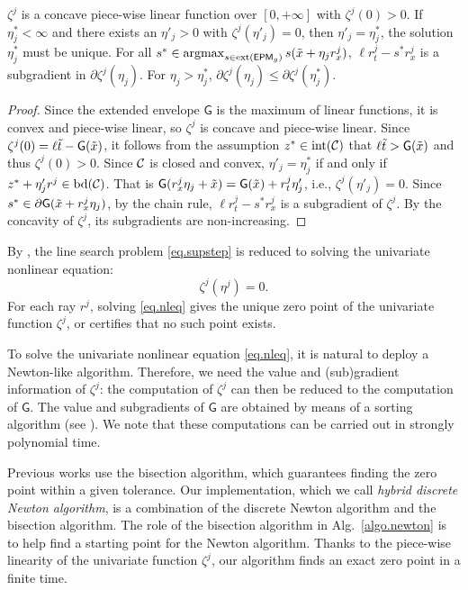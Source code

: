 \begin{proposition}
\label{prop.uni}
$\zeta^j$ is a  concave  piece-wise linear function over  $[0,+\infty]$ with  $\zeta^j(0) > 0$.  If $\eta^\ast_j < \infty$ and there exists an $\eta'_j > 0$ with $\zeta^j(\eta'_j) = 0$, then $\eta'_j = \eta^\ast_j$, \ie the solution $\eta^\ast_j$ must be unique.  For all $s^\ast \in \operatorname{argmax}_{s \in \operatorname{ext}(\mathsf{EPM}_{g})} s (\tilde{x}+\eta_j r^j_x)$, $\ell r^j_t- s^\ast r^j_x$ is a subgradient in $\partial \zeta^j( \eta_j)$. For $\eta_j > \eta^\ast_j$, $\partial \zeta^j( \eta_j) \le \partial \zeta^j( \eta^\ast_j)$.
\end{proposition}
\begin{proof}
Since  the extended envelope $\mathsf{G}$ is the maximum of linear functions, it is convex and piece-wise linear, so  $\zeta^j$ is concave and piece-wise linear. Since $\zeta^j(0) = \ell \tilde{t} - \mathsf{G}(\tilde{x})$, it follows from the assumption $z^\ast \in \operatorname{int}(\mathcal C)$ that $  \ell \tilde{t} >   \mathsf{G}(\tilde{x})$ and thus  $\zeta^j(0) > 0$. Since $\mathcal C$ is closed and convex, $\eta'_j = \eta^\ast_j$ if and only if $z^\ast + \eta'_j r^j  \in \operatorname{bd}(\mathcal C)$. That is $\mathsf{G}(r^j_x \eta_j + \tilde{x}) = \mathsf{G}(\tilde{x}) + r^j_t \eta'_j $, i.e., $\zeta^j(\eta'_j) = 0$. Since $s^\ast \in \partial {\mathsf{G}}(\tilde{x}+  r^j_x \eta_j)$, by the chain rule, $\ell r^j_t - s^\ast r^j_x$ is a subgradient of $\zeta^j$. By the concavity of $\zeta^j$, its subgradients are non-increasing.
\end{proof}


 By , the line search problem \eqref{eq.supstep} is reduced to solving the univariate nonlinear equation:
\begin{equation}
\label{eq.nleq}
	\zeta^j(\eta^j) = 0.
\end{equation}
For each ray $r^j$, solving \eqref{eq.nleq} gives the unique zero point of the univariate function $\zeta^j$, or certifies that no such point exists.



To solve the univariate nonlinear equation \eqref{eq.nleq}, it is natural to deploy a Newton-like algorithm. Therefore, we need the value and (sub)gradient information of $\zeta^j$: the  computation of $\zeta^j$ can then be reduced to the  computation of $\mathsf{G}$. The value and subgradients of $\mathsf{G}$ are obtained by means of a sorting algorithm (see ). We note that these computations can be carried out in strongly polynomial time.  

Previous works \cite{ChmielaMunozSerrano2023,xusignomial} use the bisection algorithm, which guarantees finding the zero point within a given tolerance. Our implementation, which we call \textit{hybrid discrete Newton algorithm}, is  a combination of the discrete Newton algorithm \cite{Goemans} and the bisection algorithm. The role of the bisection algorithm in Alg.~\ref{algo.newton} is to help find a starting point for the Newton algorithm. Thanks to the piece-wise linearity of the univariate function $\zeta^j$, our algorithm finds an exact zero point in a finite time.

